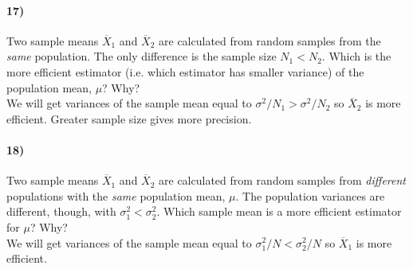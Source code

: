 \documentclass[12pt]{article}
\newcommand\ov{\overline}
\numberwithin{equation}{section}
\numberwithin{figure}{section}
\numberwithin{table}{section}
\begin{document}
\paragraph{17)} Two sample means $\ov{X}_1$ and $\ov{X}_2$ are calculated from random samples from the \emph{same} population. The only difference is the sample size $N_1<N_2$. Which is the more efficient estimator (i.e. which estimator has smaller variance) of the population mean, $\mu$? Why? \\
{\color{blue} We will get variances of the sample mean equal to $\sigma^2/N_1>\sigma^2/N_2$ so $\ov{X}_2$ is more efficient. Greater sample size gives more precision.}

\paragraph{18)} Two sample means $\ov{X}_1$ and $\ov{X}_2$ are calculated from random samples from \emph{different} populations with the \emph{same} population mean, $\mu$. The population variances are different, though, with $\sigma^2_1<\sigma^2_2$. Which sample mean is a more efficient estimator for $\mu$? Why? \\
{\color{blue} We will get variances of the sample mean equal to $\sigma_1^2/N<\sigma_2^2/N$ so $\ov{X}_1$ is more efficient.}
\end{document}
